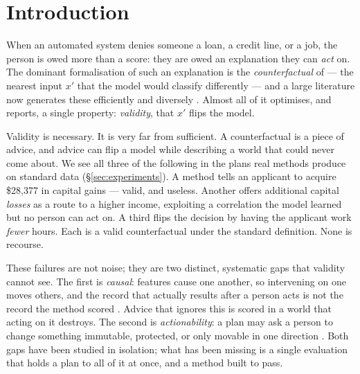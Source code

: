 \section{Introduction}
\label{sec:intro}

When an automated system denies someone a loan, a credit line, or a job, the
person is owed more than a score: they are owed an explanation they can
\emph{act} on. The dominant formalisation of such an explanation is the
\emph{counterfactual} of \citet{wachter2017counterfactual} --- the nearest input
$x'$ that the model would classify differently --- and a large literature now
generates these efficiently and diversely
\citep{mothilal2020dice,vanlooveren2021interpretable,verma2020counterfactual}.
Almost all of it optimises, and reports, a single property: \emph{validity}, that
$x'$ flips the model.

Validity is necessary. It is very far from sufficient. A counterfactual is a
piece of advice, and advice can flip a model while describing a world that could
never come about. We see all three of the following in the plans real methods
produce on standard data (\S\ref{sec:experiments}). A method tells an applicant
to acquire \$28{,}377 in capital gains --- valid, and useless. Another offers
additional capital \emph{losses} as a route to a higher income, exploiting a
correlation the model learned but no person can act on. A third flips the
decision by having the applicant work \emph{fewer} hours. Each is a valid
counterfactual under the standard definition. None is recourse.

These failures are not noise; they are two distinct, systematic gaps that
validity cannot see. The first is \emph{causal}: features cause one another, so
intervening on one moves others, and the record that actually results after a
person acts is not the record the method scored
\citep{karimi2021recourse,pearl2009causality}. Advice that ignores this is scored
in a world that acting on it destroys. The second is \emph{actionability}: a plan
may ask a person to change something immutable, protected, or only movable in one
direction \citep{ustun2019actionable,poyiadzi2020face}. Both gaps have been
studied in isolation; what has been missing is a single evaluation that holds a
plan to all of it at once, and a method built to pass.

